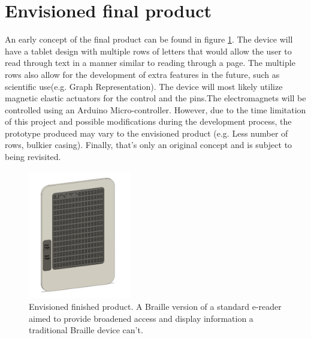 \section{Envisioned final product}
An early concept of the final product can be found in figure \ref{fig:e-reader}.
The device will have a tablet design with multiple rows of letters that would allow the user to read through text in a manner similar to reading through a page.
The multiple rows also allow for the development of extra features in the future, such as scientific use(e.g. Graph Representation).
The device will most likely utilize magnetic elastic actuators for the control and the pins.The electromagnets will be controlled using an Arduino Micro-controller.
However, due to the time limitation of this project and possible modifications during the development process, the prototype produced may vary to the envisioned product (e.g. Less number of rows, bulkier casing).
Finally, that's only an original concept and is subject to being revisited.

\begin{figure}[h]
\centering
    \includegraphics[width=0.4\textwidth]{figures/e-reader.png}
\caption[Envisioned finished product]{Envisioned finished product. A Braille version of a standard e-reader aimed to provide broadened access and display information a traditional Braille device can't.}
\label{fig:e-reader}
\end{figure}


